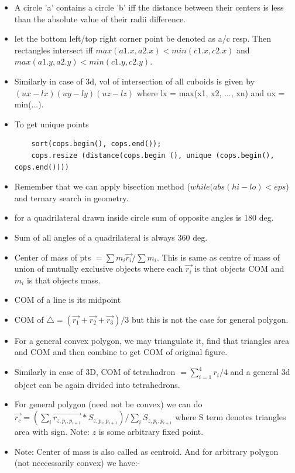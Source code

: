 \documentclass[8pt, a4paper, oneside, twocolumn]{extarticle}
\begin{document}
\begin{itemize}
    \item A circle 'a' contains a circle 'b' iff the distance between their centers is less than the absolute value of their radii difference.
    \item let the bottom left/top right corner point be denoted as a/c resp. Then rectangles intersect iff $max(a1.x, a2.x) < min(c1.x, c2.x)$ and $max(a1.y, a2.y) < min(c1.y, c2.y)$.
    \item Similarly in case of 3d, vol of intersection of all cuboids is given by $(ux - lx)(uy - ly)(uz - lz)$ where lx = max(x1, x2, ..., xn) and ux = min(...).
    \item To get unique points 
    \begin{verbatim}
    sort(cops.begin(), cops.end());
    cops.resize (distance(cops.begin (), unique (cops.begin(), cops.end())))
    \end{verbatim}
    \item Remember that we can apply bisection method ($while (abs(hi - lo) < eps$) and ternary search in geometry.
    \item for a quadrilateral drawn inside circle sum of opposite angles is 180 deg.
    \item Sum of all angles of a quadrilateral is always 360 deg.
    \item Center of mass of pts $= \sum m_i \vec{r_i}/\sum{m_i}$. This is same as centre of mass of union of mutually exclusive objects where each $\vec{r_i}$ is that objects COM and $m_i$ is that objects mass.
    \item COM of a line is its midpoint
    \item COM of $\triangle = (\vec{r_1} + \vec{r_2} + \vec{r_3}) / 3$ but this is not the case for general polygon.
    \item For a general convex polygon, we may triangulate it, find that triangles area and COM and then combine to get COM of original figure.
    \item Similarly in case of 3D, COM of tetrahadron $= \sum_{i = 1}^{4}r_i/4$ and a general 3d object can be again divided into tetrahedrons.
    \item For general polygon (need not be convex) we can do $\vec{r_c} = (\sum_{i}\vec{r_{z,p_i, p_{i + 1}}} * S_{z, p_i, p_{i + 1}}) / \sum_i S_{z, p_i, p_{i + 1}}$ where S term denotes triangles area with sign. Note: $z$ is some arbitrary fixed point.
    \item Note: Center of mass is also called as centroid. And for arbitrary polygon (not neccessarily convex) we have:-

\end{itemize}
\end{document}

